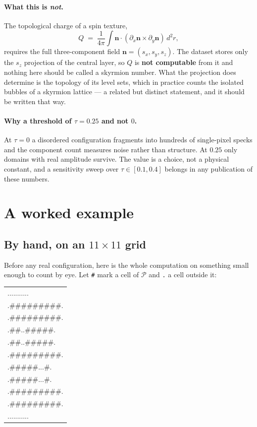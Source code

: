 \documentclass[11pt,a4paper]{article}
\begin{document}
\paragraph{What this is \emph{not}.}
The topological charge of a spin texture,
\[
  Q \;=\; \frac{1}{4\pi}\int \mathbf{n}\cdot
          \left(\partial_x\mathbf{n}\times\partial_y\mathbf{n}\right)\,d^2r ,
\]
requires the full three-component field $\mathbf{n}=(s_x,s_y,s_z)$. The dataset stores only
the $s_z$ projection of the central layer, so $Q$ is \textbf{not computable} from it and
nothing here should be called a skyrmion number. What the projection does determine is the
topology of its level sets, which in practice counts the isolated bubbles of a skyrmion
lattice --- a related but distinct statement, and it should be written that way.

\paragraph{Why a threshold of $\tau=0.25$ and not $0$.}
At $\tau=0$ a disordered configuration fragments into hundreds of single-pixel specks and
the component count measures noise rather than structure. At $0.25$ only domains with real
amplitude survive. The value is a choice, not a physical constant, and a sensitivity sweep
over $\tau\in[0.1,0.4]$ belongs in any publication of these numbers.

\section{A worked example}

\subsection{By hand, on an $11\times11$ grid}

Before any real configuration, here is the whole computation on something small enough to
count by eye. Let \texttt{\#} mark a cell of $\mathcal{P}$ and \texttt{.} a cell outside it:

\begin{center}\ttfamily\small
\begin{tabular}{l}
...........\\
.\#\#\#\#\#\#\#\#\#.\\
.\#\#\#\#\#\#\#\#\#.\\
.\#\#..\#\#\#\#\#.\\
.\#\#..\#\#\#\#\#.\\
.\#\#\#\#\#\#\#\#\#.\\
.\#\#\#\#\#...\#.\\
.\#\#\#\#\#...\#.\\
.\#\#\#\#\#\#\#\#\#.\\
.\#\#\#\#\#\#\#\#\#.\\
...........\\
\end{tabular}
\end{center}
\end{document}

